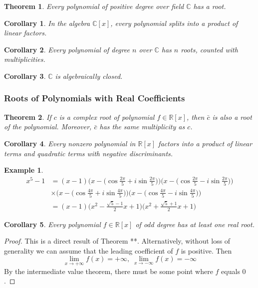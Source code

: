 \documentclass{article}
\newtheorem{theorem}{Theorem}[section]
\newtheorem{example}{Example}[section]
\newtheorem{corollary}{Corollary}[theorem]
\theoremstyle{remark}
\theoremstyle{definition}
\begin{document}
\begin{theorem}
Every polynomial of positive degree over field $\mathbb{C}$ has a root. 
\end{theorem}

\begin{corollary}
In the algebra $\mathbb{C}[x]$, every polynomial splits into a product of linear factors. 
\end{corollary}

\begin{corollary}
Every polynomial of degree $n$ over $\mathbb{C}$ has $n$ roots, counted with multiplicities. 
\end{corollary}

\begin{corollary}
$\mathbb{C}$ is algebraically closed. 
\end{corollary}

\subsubsection{Roots of Polynomials with Real Coefficients}
\begin{theorem}
If $c$ is a complex root of polynomial $f \in \mathbb{R}[x]$, then $\bar{c}$ is also a root of the polynomial. Moreover, $\bar{c}$ has the same multiplicity as $c$. 
\end{theorem}

\begin{corollary}
Every nonzero polynomial in $\mathbb{R}[x]$ factors into a product of linear terms and quadratic terms with negative discriminants. 
\end{corollary}

\begin{example}
\begin{align*}
    x^5 - 1 & = (x-1) \bigg( x - \Big( \cos{\frac{2\pi}{5}} + i \sin{\frac{2\pi}{5}}\Big) \bigg) \bigg( x - \Big( \cos{\frac{2\pi}{5}} - i \sin{\frac{2\pi}{5}}\Big) \bigg) \\
    & \times \bigg( x - \Big( \cos{\frac{4\pi}{5}} + i \sin{\frac{4\pi}{5}}\Big) \bigg) \bigg( x - \Big( \cos{\frac{4\pi}{5}} - i \sin{\frac{4\pi}{5}}\Big) \bigg) \\
    & = (x-1) \bigg( x^2 - \frac{\sqrt{5} - 1}{2} x + 1\bigg) \bigg( x^2 + \frac{\sqrt{5} + 1}{2} x + 1\bigg) 
\end{align*}
\end{example}

\begin{corollary}
Every polynomial $f \in \mathbb{R}[x]$ of odd degree has at least one real root. 
\end{corollary}
\begin{proof}
This is a direct result of Theorem **. Alternatively, without loss of generality we can assume that the leading coefficient of $f$ is positive. Then
\[ \lim_{x \rightarrow + \infty} f(x) = + \infty, \; \lim_{x \rightarrow -\infty} f(x) = -\infty\]
By the intermediate value theorem, there must be some point where $f$ equals $0$. 
\end{proof}
\end{document}
